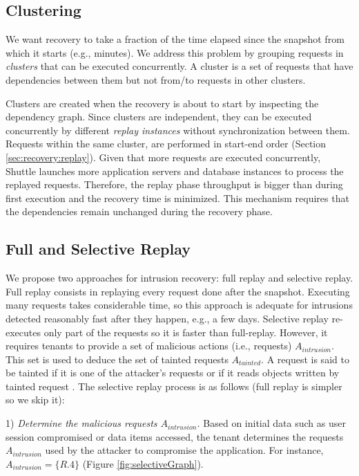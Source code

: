 \documentclass[10pt,conference]{IEEEtran}
\begin{document}
\subsection{Clustering}
\label{sec:recovery:clusters}

We want recovery to take a fraction of the time elapsed since the snapshot from which it starts (e.g., minutes). 
We address this problem by grouping  requests in \emph{clusters} that can be executed concurrently. 
A cluster is a set of requests that have dependencies between them but not from/to requests in other clusters. 

Clusters are created when the recovery is about to start by inspecting the dependency graph. Since clusters are independent, they can be executed concurrently by different \emph{replay instances} without  synchronization between them. Requests within the same cluster, are performed in start-end order (Section \ref{sec:recovery:replay}). Given that more requests are executed concurrently, Shuttle launches more application servers and database instances to process the replayed requests. Therefore, the replay phase throughput is bigger than during first execution and the recovery time is minimized. This mechanism requires that the dependencies remain unchanged during the recovery phase.


\subsection{Full and Selective Replay}
\label{sec:recovery:selective_replay}

We propose two approaches for intrusion recovery: full replay and selective replay. Full replay consists in replaying every request done after the  snapshot. Executing many requests takes considerable time, so this approach is adequate for intrusions detected reasonably fast after they happen, e.g., a few days. Selective replay re-executes only part of the requests so it is faster than full-replay. However, it requires tenants to provide a set of malicious actions (i.e., requests) $A_{intrusion}$. This set is used to deduce the set of tainted requests $A_{tainted}$. A request is said to be tainted if it is one of the attacker’s requests or if it reads objects written by tainted request \cite{taser,itdb,phoenix}.  The selective replay process is as follows (full replay is simpler so we skip it):

{1)} \textit{Determine the malicious requests $A_{intrusion}$.}
  Based on initial data such as user session compromised or data items accessed, the tenant determines the requests $A_{intrusion}$ used by the attacker to compromise the application. For instance, $A_{intrusion} = \{R.4\} $ (Figure \ref{fig:selectiveGraph}).
\end{document}
